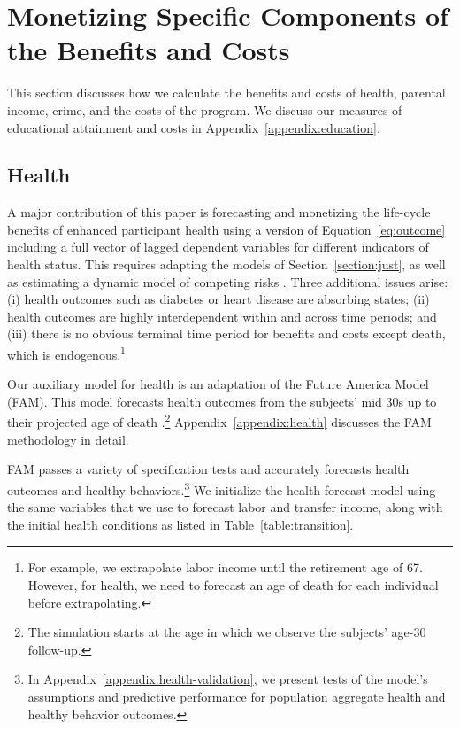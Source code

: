 \section{Monetizing Specific Components of the Benefits and Costs}
\label{section:monetizing-benefits-costs}

This section discusses how we calculate the benefits and costs of health, parental income, crime, and the costs of the program. We discuss our measures of educational attainment and costs in Appendix~\ref{appendix:education}.

\subsection{Health} \label{section:health}

A major contribution of this paper is forecasting and monetizing the life-cycle benefits of enhanced participant health using a version of Equation~\eqref{eq:outcome} including a full vector of lagged dependent variables for different indicators of health status. This requires adapting the models of Section~\ref{section:just}, as well as estimating a dynamic model of competing risks \citep{Kalbfleisch_Prentice_1980_failure}. Three additional issues arise: (i) health outcomes such as diabetes or heart disease are absorbing states; (ii) health outcomes are highly interdependent within and across time periods; and (iii) there is no obvious terminal time period for benefits and costs except death, which is endogenous.\footnote{For example, we extrapolate labor income until the retirement age of 67. However, for health, we need to forecast an age of death for each individual before extrapolating.}

Our auxiliary model for health is an adaptation of the Future America Model (FAM). This model forecasts health outcomes from the subjects' mid 30s up to their projected age of death \citep{Goldman_etal_2015_Future-Elderly-Model-Report}.\footnote{The simulation starts at the age in which we observe the subjects' age-30 follow-up.}  Appendix~\ref{appendix:health} discusses the FAM methodology in detail.

FAM passes a variety of specification tests and accurately forecasts health outcomes and healthy behaviors.\footnote{In Appendix~\ref{appendix:health-validation}, we present tests of the model's assumptions and predictive performance for population aggregate health and healthy behavior outcomes.} We initialize the health forecast model using the same variables that we use to forecast labor and transfer income, along with the initial health conditions as listed in Table~\ref{table:transition}.

